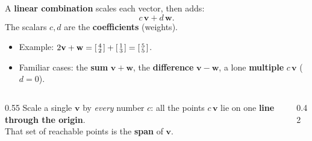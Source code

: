\documentclass[aspectratio=169, 11pt]{beamer}
\newcommand{\vv}{\mathbf{v}}
\newcommand{\ww}{\mathbf{w}}
\begin{document}
\begin{frame}[t, plain]
  A \textbf{linear combination} scales each vector, then adds:
  \[
    c\,\vv + d\,\ww .
  \]
  The scalars $c,d$ are the \textbf{coefficients} (weights).
  \begin{itemize}
    \item Example: $2\vv+\ww=\begin{bsmallmatrix} 4\\2 \end{bsmallmatrix}+\begin{bsmallmatrix} 1\\3 \end{bsmallmatrix}=\begin{bsmallmatrix} 5\\5 \end{bsmallmatrix}$.
    \item Familiar cases: the \textbf{sum} $\vv+\ww$, the \textbf{difference} $\vv-\ww$, a lone \textbf{multiple} $c\,\vv$ ($d=0$).
  \end{itemize}
\end{frame}

\begin{frame}[t, plain]
  \begin{columns}[T]
    \begin{column}{0.55\textwidth}
      Scale a single $\vv$ by \emph{every} number $c$: all the points $c\,\vv$ lie on one
      \textbf{line through the origin}.\\[8pt]
      That set of reachable points is the \textbf{span} of $\vv$.
    \end{column}
    \begin{column}{0.42\textwidth}
      \centering
    \end{column}
  \end{columns}
\end{frame}
\end{document}
